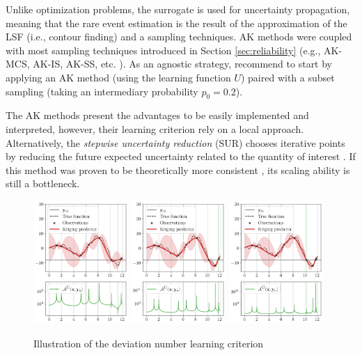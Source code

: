 Unlike optimization problems, the surrogate is used for uncertainty propagation, meaning that the rare event estimation is the result of the approximation of the LSF (i.e., contour finding) and a sampling techniques. 
AK methods were coupled with most sampling techniques introduced in Section \ref{sec:reliability} (e.g., AK-MCS, AK-IS, AK-SS, etc. ). 
As an agnostic strategy, \citet{moustapha_ss_2022} recommend to start by applying an AK method (using the learning function $U$) paired with a subset sampling (taking an intermediary probability $p_0 =0.2$). 

The AK methods present the advantages to be easily implemented and interpreted, however, their learning criterion rely on a local approach. 
Alternatively, the \textit{stepwise uncertainty reduction} (SUR) chooses iterative points by reducing the future expected uncertainty related to the quantity of interest \citep{bect_ginsbourger_2012}. 
If this method was proven to be theoretically more consistent \citep{bect_ginsbourger_2019}, its scaling ability is still a bottleneck.  

\begin{figure}[ht]
    \centering
    \includegraphics[width=0.32\textwidth]{../numerical_experiments/chapter1/figures/contour_find_0.png}
    \includegraphics[width=0.32\textwidth]{../numerical_experiments/chapter1/figures/contour_find_1.png}
    \includegraphics[width=0.32\textwidth]{../numerical_experiments/chapter1/figures/contour_find_2.png}
    \caption{Illustration of the deviation number learning criterion}
    \label{fig:AK_1D}
\end{figure}

